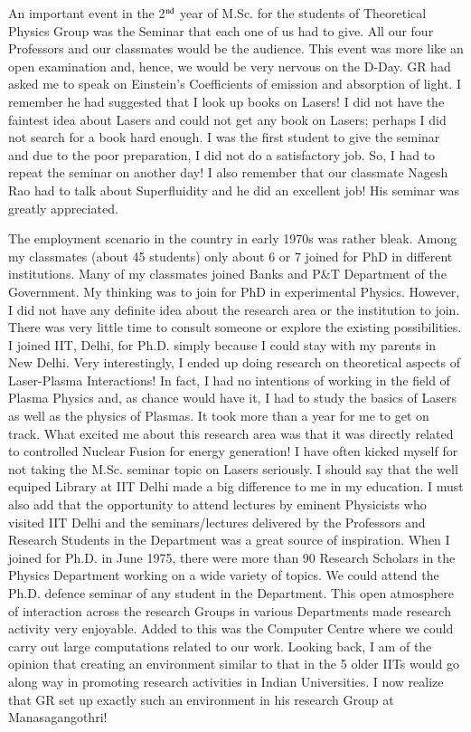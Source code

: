 An important event in the 2$^{\rm nd}$ year of M.Sc. for the students of Theoretical Physics Group was the Seminar that each one of us had to give. All our four Professors and our classmates would be the audience. This event was more like an open examination and, hence, we would be very nervous on the D-Day. GR had asked me to speak on Einstein's Coefficients of emission and absorption of light. I remember he had suggested that I look up books on Lasers! I did not have the faintest idea about Lasers and could not get any book on Lasers; perhaps I did not search for a book hard enough. I was the first student to give the seminar and due to the poor preparation, I did not do a satisfactory job. So, I had to repeat the seminar on another day! I also remember that our classmate Nagesh Rao had to talk about Superfluidity and he did an excellent job! His seminar was greatly appreciated.

The employment scenario in the country in early 1970s was rather bleak. Among my classmates (about 45 students) only about 6 or 7 joined for PhD in different institutions. Many of my classmates joined Banks and P\&T Department of the Government. My thinking was to join for PhD in experimental Physics. However, I did not have any definite idea about the research area or the institution to join. There was very little time to consult someone or explore the existing possibilities. I joined IIT, Delhi, for Ph.D. simply because I could stay with my parents in New Delhi. Very interestingly, I ended up doing research on theoretical aspects of Laser-Plasma Interactions! In fact, I had no intentions of working in the field of Plasma Physics and, as chance would have it, I had to study the basics of Lasers as well as the physics of Plasmas. It took more than a year for me to get on track. What excited me about this research area was that it was directly related to controlled Nuclear Fusion for energy generation! I have often kicked myself for not taking the M.Sc. seminar topic on Lasers seriously. I should say that the well equiped Library at IIT Delhi made a big difference to me in my education. I must also add that the opportunity to attend lectures by eminent Physicists who visited IIT Delhi and the seminars/lectures delivered by the Professors and Research Students in the Department was a great source of inspiration. When I joined for Ph.D. in June 1975, there were more than 90 Research Scholars in the Physics Department working on a wide variety of topics. We could attend the Ph.D. defence seminar of any student in the Department. This open atmosphere of interaction across the research Groups in various Departments made research activity very enjoyable. Added to this was the Computer Centre where we could carry out large computations related to our work. Looking back, I am of the opinion that creating an environment similar to that in the 5 older IITs would go along way in promoting research activities in Indian Universities. I now realize that GR set up exactly such an environment in his research Group at Manasagangothri!

